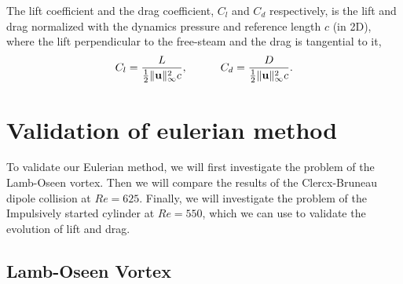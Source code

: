 The lift coefficient and the drag coefficient, $C_l$ and $C_d$ respectively, is the lift and drag normalized with the dynamics pressure and reference length $c$ (in 2D), where the lift perpendicular to the free-steam and the drag is tangential to it,
		\begin{equation}
		C_l = \frac{L}{\frac{1}{2}\lVert\mathbf{u}\rVert_{\infty}^2 c},\qquad \quad
		C_d = \frac{D}{\frac{1}{2}\lVert\mathbf{u}\rVert_{\infty}^2 c}.\\
		\label{eq:LiftDragCoeffEq}
		\end{equation}

\section{Validation of eulerian method}
To validate our Eulerian method, we will first investigate the problem of the Lamb-Oseen vortex. Then we will compare the results of the Clercx-Bruneau dipole collision at $Re=625$. Finally, we will investigate the problem of the Impulsively started cylinder at $Re=550$, which we can use to validate the evolution of lift and drag.

\subsection{Lamb-Oseen Vortex}


